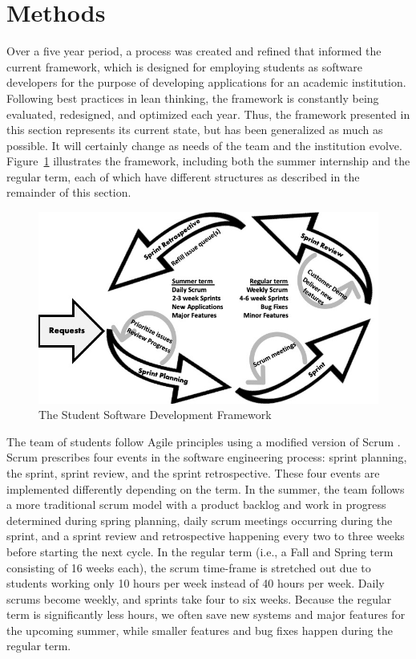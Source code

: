 \section{Methods}
Over a five year period, a process was created and refined that informed the current framework, which is designed for employing students as software developers for the purpose of developing applications for an academic institution. Following best practices in lean thinking, the framework is constantly being evaluated, redesigned, and optimized each year. Thus, the framework presented in this section represents its current state, but has been generalized as much as possible. It will certainly change as needs of the team and the institution evolve. Figure~\ref{fig:framework} illustrates the framework, including both the summer internship and the regular term, each of which have different structures as described in the remainder of this section. 

\begin{figure}[htbp]
 \centering
 \includegraphics[width=\linewidth]{developmentcycle4.jpg}
 \caption{The Student Software Development Framework}
 \label{fig:framework}
\end{figure}

The team of students follow Agile principles \cite{agilemanifesto} using a modified version of Scrum \cite{thescrumguide}. Scrum prescribes four events in the software engineering process: sprint planning, the sprint, sprint review, and the sprint retrospective. These four events are implemented differently depending on the term. In the summer, the team follows a more traditional scrum model with a product backlog and work in progress determined during spring planning, daily scrum meetings occurring during the sprint, and a sprint review and retrospective happening every two to three weeks before starting the next cycle. In the regular term (i.e., a Fall and Spring term consisting of 16 weeks each), the scrum time-frame is stretched out due to students working only 10 hours per week instead of 40 hours per week. Daily scrums become weekly, and sprints take four to six weeks. Because the regular term is significantly less hours, we often save new systems and major features for the upcoming summer, while smaller features and bug fixes happen during the regular term. 

